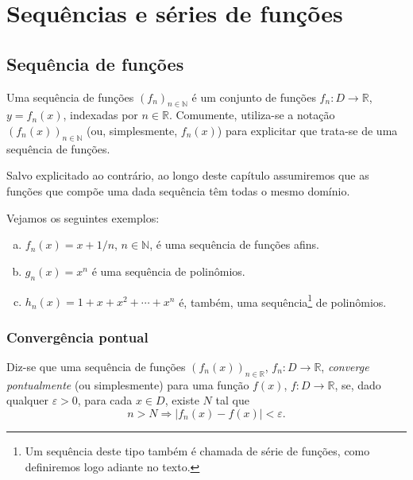 

\chapter{Sequências e séries de funções}\label{cap_ssfuncoes}
\thispagestyle{fancy}

\section{Sequência de funções}\label{cap_ssfuncoes_sec_sf}

\begin{defn}
  Uma sequência de funções $(f_n)_{n\in\mathbb{N}}$ é um conjunto de funções $f_n:D\to\mathbb{R}$, $y=f_n(x)$, indexadas por $n\in\mathbb{R}$. Comumente, utiliza-se a notação $(f_n(x))_{n\in\mathbb{N}}$ (ou, simplesmente, $f_n(x)$) para explicitar que trata-se de uma sequência de funções.
\end{defn}

\begin{obs}
  Salvo explicitado ao contrário, ao longo deste capítulo assumiremos que as funções que compõe uma dada sequência têm todas o mesmo domínio.
\end{obs}

\begin{ex}
  Vejamos os seguintes exemplos:
  \begin{enumerate}[a)]
  \item $f_n(x) = x+1/n$, $n\in\mathbb{N}$, é uma sequência de funções afins.
  \item $g_n(x) = x^n$ é uma sequência de polinômios.
  \item $h_n(x) = 1 + x + x^2 + \cdots + x^n$ é, também, uma sequência\footnote{Um sequência deste tipo também é chamada de série de funções, como definiremos logo adiante no texto.} de polinômios.
  \end{enumerate}
\end{ex}

\subsection{Convergência pontual}

\begin{defn}
  Diz-se que uma sequência de funções $(f_n(x))_{n\in\mathbb{R}}$, $f_n:D\to\mathbb{R}$, \emph{converge pontualmente} (ou simplesmente) para uma função $f(x)$, $f:D\to\mathbb{R}$, se, dado qualquer $\varepsilon>0$, para cada $x\in D$, existe $N$ tal que
  \begin{equation}
    n>N \Rightarrow |f_n(x)-f(x)|<\varepsilon.
  \end{equation}
\end{defn}


